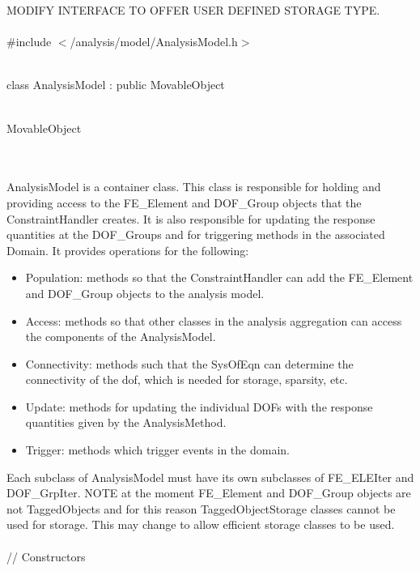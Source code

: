 
MODIFY INTERFACE TO OFFER USER DEFINED STORAGE TYPE. \\

   \\
\#include $<$/analysis/model/AnalysisModel.h$>$  


  \\
class AnalysisModel : public MovableObject  


 \\
MovableObject 

\indent{} \\

  \\
\indent AnalysisModel is a container class. This class is responsible
for holding and providing access to the FE\_Element and DOF\_Group
objects that the ConstraintHandler creates. It is also responsible
for updating the response quantities at the DOF\_Groups and for
triggering methods in the associated Domain. It provides operations
for the following: \begin{itemize} 
\item Population: methods so that the ConstraintHandler can add the
FE\_Element and DOF\_Group objects to the analysis model. 
\item Access: methods so that other classes in the analysis aggregation
can access the components of the AnalysisModel. 
\item Connectivity: methods such that the SysOfEqn can determine the
connectivity of the dof, which is needed for storage, sparsity, etc.
\item Update: methods for updating the individual DOFs with the
response quantities given by the AnalysisMethod.
\item Trigger: methods which trigger events in the domain.
\end{itemize} 
Each subclass of AnalysisModel must have its own subclasses
of FE\_ELEIter and DOF\_GrpIter. NOTE at the moment FE\_Element and
DOF\_Group objects are not TaggedObjects and for this reason
TaggedObjectStorage classes cannot be used for storage. This may
change to allow efficient storage classes to be used.\\

  \\
// Constructors 


